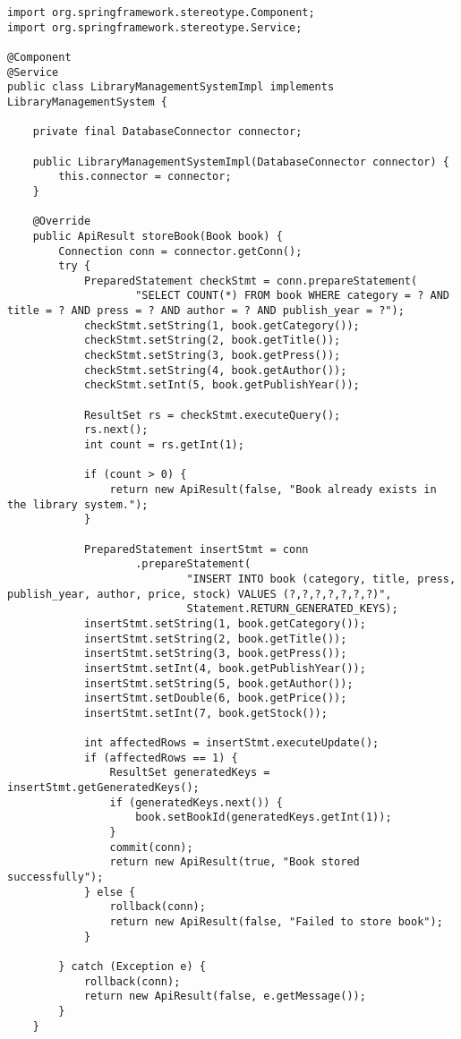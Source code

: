 \documentclass{ctexart}
\begin{document}
\begin{lstlisting}[caption=\texttt{library.system/LibraryManagementSystemImpl.java}]
import org.springframework.stereotype.Component;
import org.springframework.stereotype.Service;

@Component
@Service
public class LibraryManagementSystemImpl implements LibraryManagementSystem {

    private final DatabaseConnector connector;

    public LibraryManagementSystemImpl(DatabaseConnector connector) {
        this.connector = connector;
    }

    @Override
    public ApiResult storeBook(Book book) {
        Connection conn = connector.getConn();
        try {
            PreparedStatement checkStmt = conn.prepareStatement(
                    "SELECT COUNT(*) FROM book WHERE category = ? AND title = ? AND press = ? AND author = ? AND publish_year = ?");
            checkStmt.setString(1, book.getCategory());
            checkStmt.setString(2, book.getTitle());
            checkStmt.setString(3, book.getPress());
            checkStmt.setString(4, book.getAuthor());
            checkStmt.setInt(5, book.getPublishYear());

            ResultSet rs = checkStmt.executeQuery();
            rs.next();
            int count = rs.getInt(1);

            if (count > 0) {
                return new ApiResult(false, "Book already exists in the library system.");
            }

            PreparedStatement insertStmt = conn
                    .prepareStatement(
                            "INSERT INTO book (category, title, press, publish_year, author, price, stock) VALUES (?,?,?,?,?,?,?)",
                            Statement.RETURN_GENERATED_KEYS);
            insertStmt.setString(1, book.getCategory());
            insertStmt.setString(2, book.getTitle());
            insertStmt.setString(3, book.getPress());
            insertStmt.setInt(4, book.getPublishYear());
            insertStmt.setString(5, book.getAuthor());
            insertStmt.setDouble(6, book.getPrice());
            insertStmt.setInt(7, book.getStock());

            int affectedRows = insertStmt.executeUpdate();
            if (affectedRows == 1) {
                ResultSet generatedKeys = insertStmt.getGeneratedKeys();
                if (generatedKeys.next()) {
                    book.setBookId(generatedKeys.getInt(1));
                }
                commit(conn);
                return new ApiResult(true, "Book stored successfully");
            } else {
                rollback(conn);
                return new ApiResult(false, "Failed to store book");
            }

        } catch (Exception e) {
            rollback(conn);
            return new ApiResult(false, e.getMessage());
        }
    }

\end{lstlisting}
\end{document}
